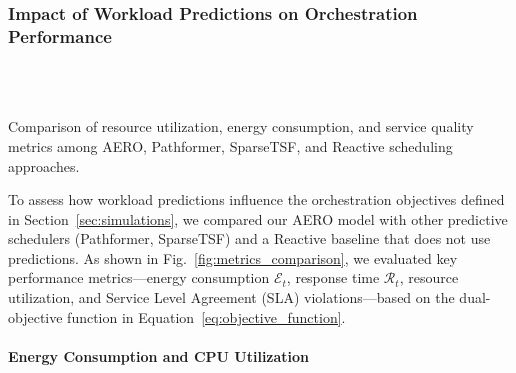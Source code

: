 \documentclass{ieeetmlcn}
\begin{document}
\subsubsection{Impact of Workload Predictions on Orchestration Performance}

\par\medskip\begin{center}\centering
    \hfill
    \\
    \hfill
    \\
    \hfill
    \caption{Comparison of resource utilization, energy consumption, and service quality metrics among AERO, Pathformer, SparseTSF, and Reactive scheduling approaches.}
    \label{fig:metrics_comparison}\end{center}\medskip\par

To assess how workload predictions influence the orchestration objectives defined in Section~\ref{sec:simulations}, we compared our AERO model with other predictive schedulers (Pathformer, SparseTSF) and a Reactive baseline that does not use predictions. As shown in Fig.~\ref{fig:metrics_comparison}, we evaluated key performance metrics—energy consumption $\mathcal{E}_t$, response time $\mathcal{R}_t$, resource utilization, and Service Level Agreement (SLA) violations—based on the dual-objective function in Equation~\eqref{eq:objective_function}.

\paragraph*{Energy Consumption and CPU Utilization}
\end{document}
